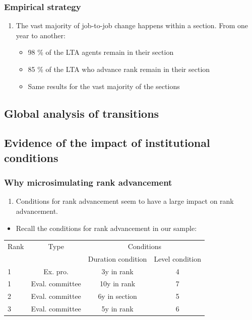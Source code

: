 \documentclass[xcolor=table,ignorenonframetext,12pt]{beamer}
\newcounter{sauvegardeenumi}
\newcommand{\asuivre}{\setcounter{sauvegardeenumi}{\theenumi}}
\newcommand{\suite}{\setcounter{enumi}{\thesauvegardeenumi}}
\begin{document}
\begin{frame}
\frametitle{Empirical strategy}

\begin{enumerate}
\suite
\item The vast majority of job-to-job change happens within a section. From one year to another:
\begin{itemize}
\item 98 \% of the LTA agents remain in their section
\item 85 \% of the LTA who advance rank remain in their section
\item Same results for the vast majority of the sections
\end{itemize}
\asuivre
\end{enumerate}
\end{frame}

\subsection{Global analysis of transitions}

\subsection{Evidence of the impact of institutional conditions}


\begin{frame}




\frametitle{Why microsimulating rank advancement}
\begin{enumerate}
\suite
\item Conditions for rank advancement seem to have a large impact on rank advancement.
\end{enumerate}
\begin{itemize}
\item Recall the conditions for rank advancement in our sample:
\end{itemize}
\begin{table}
\small
\begin{tabular}{l|c|cc}

\toprule
Rank  & Type &  \multicolumn{2}{c}{Conditions}  \\
&  			&  Duration condition	&  Level condition \\
\midrule
1  &	Ex. pro. 	&   3y in rank  & 	4  \\
1  &	Eval. committee 	& 	10y in rank &	7   \\ \midrule
2  & 	Eval. committee		& 	6y in section  &	5   \\ \midrule
3  & 	Eval. committee		& 	5y in rank  &	6   \\	
%	
\bottomrule
\end{tabular}
\end{table}

\end{frame}
\end{document}
